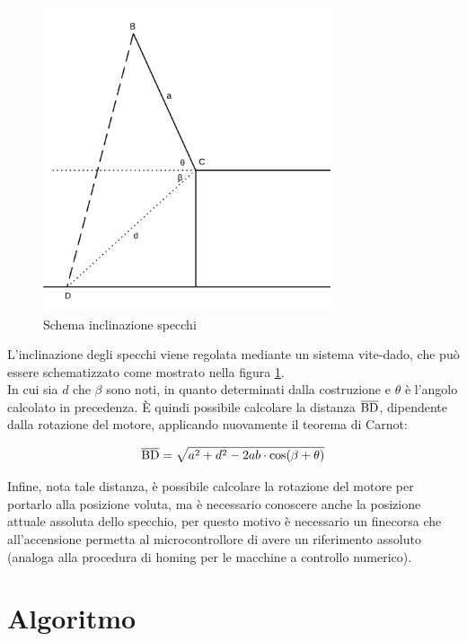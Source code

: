 \documentclass[12pt]{article}
\begin{document}
    \begin{figure}[h]
    \centering
        \includegraphics[width=240pt]{Draws/Linear_inclination_trig.png}
        \caption{Schema inclinazione specchi}
        \label{mirror_inclination_system}
    \end{figure}
    
    
    L'inclinazione degli specchi viene regolata mediante un sistema vite-dado, che può essere schematizzato come mostrato nella figura \ref{mirror_inclination_system}.\\
    
    In cui sia $d$ che $\beta$ sono noti, in quanto determinati dalla costruzione e $\theta$ è l'angolo calcolato in precedenza. È quindi possibile calcolare la distanza $\overline{\rm BD}$, dipendente dalla rotazione del motore, applicando nuovamente il teorema di Carnot:
    
    \begin{equation}
        \overline{\rm BD} = \sqrt{a^2 + d^2 - 2 a b \cdot \cos(\beta + \theta)}
    \end{equation}
    
    \vspace{1.5cm}
    
    Infine, nota tale distanza, è possibile calcolare la rotazione del motore per portarlo alla posizione voluta, ma è necessario conoscere anche la posizione attuale assoluta dello specchio, per questo motivo è necessario un finecorsa che all'accensione permetta al microcontrollore di avere un riferimento assoluto (analoga alla procedura di homing per le macchine a controllo numerico).


\newpage
\section{Algoritmo}
\end{document}
